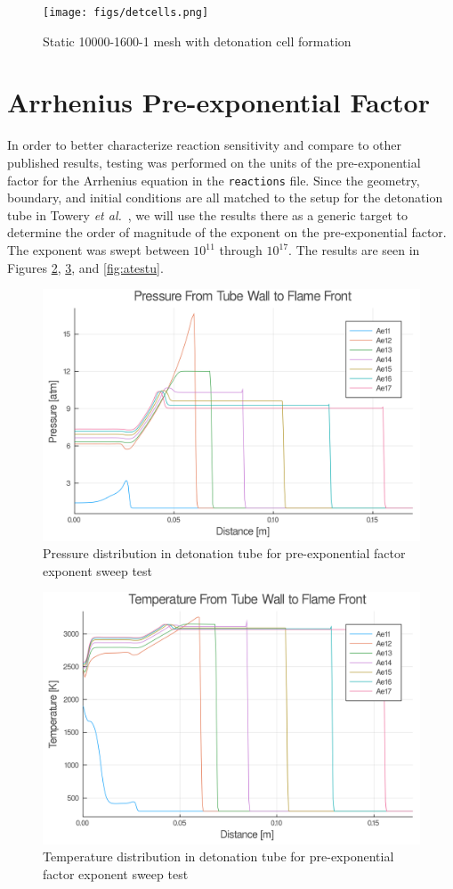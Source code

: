\begin{figure}
\centering 
\texttt{[image: figs/detcells.png]}
\caption{Static 10000-1600-1 mesh with detonation cell formation}
\label{fig:detcells}
\end{figure}


\section{Arrhenius Pre-exponential Factor}
\label{sec:a}

In order to better characterize reaction sensitivity and compare to other published results, testing was performed on the units of the pre-exponential factor for the Arrhenius equation in the \verb|reactions| file. Since the geometry, boundary, and initial conditions are all matched to the setup for the detonation tube in Towery \textit{et al.}~\cite{towery1}, we will use the results there as a generic target to determine the order of magnitude of the exponent on the pre-exponential factor. The exponent was swept between \(10^{11}\) through \(10^{17}\). The results are seen in Figures \ref{fig:atestp}, \ref{fig:atestt}, and \ref{fig:atestu}. 

\begin{figure}
\centering
\includegraphics[width=0.85\linewidth]{./figs/Atest/p.png}
\caption{Pressure distribution in detonation tube for pre-exponential factor exponent sweep test}
\label{fig:atestp}
\end{figure}

\begin{figure}
\centering
\includegraphics[width=0.85\linewidth]{./figs/Atest/t.png}
\caption{Temperature distribution in detonation tube for pre-exponential factor exponent sweep test}
\label{fig:atestt}
\end{figure}

